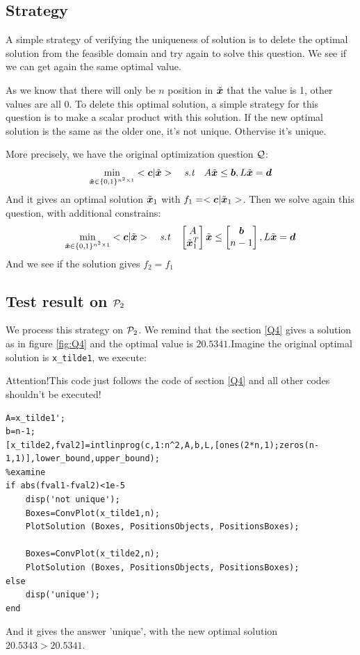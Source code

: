 \documentclass{CSArticle}[english]
\def\xtd{\tilde{\xbs}}
\begin{document}
\subsection{Strategy}
A simple strategy of verifying the uniqueness of solution is to delete the optimal solution from the feasible domain and try again to solve this question. We see if we can get again the same optimal value.\par
As we know that there will only be $n$ position in $\xtd$ that the value is 1, other values are all 0. To delete this optimal solution, a simple strategy for this question is to make a scalar product with this solution. If the new optimal solution is the same as the older one, it's not unique. Othervise it's unique.\par
More precisely, we have the original optimization question $\mathcal{Q}$:
\begin{equation*}
        \min_{\xtd \in \{0,1\}^{n^2\times 1}} <\cbs|\xtd> \quad \st  \quad A \xtd \le \bbs, L\xtd= \dbs
\end{equation*}
And it gives an optimal solution $\xtd_1$ with $f_1=<\cbs|\xtd_1>$.
Then we solve again this question, with additional constrains:
\begin{equation*}
        \min_{\xtd \in \{0,1\}^{n^2\times 1}} <\cbs|\xtd> \quad \st  \quad \left[\begin{matrix}A\\\xtd_1^{T}\end{matrix}\right] \xtd \le \left[\begin{matrix}\bbs\\n-1\end{matrix}\right], L\xtd= \dbs
\end{equation*}
And we see if the solution gives $f_2=f_1$
\subsection{Test result on $\mathcal{P}_2$}
We process this strategy on $\mathcal{P}_2$. We remind that the section \ref{Q4} gives a solution as in figure \ref{fig:Q4} and the optimal value is $20.5341$.Imagine the original optimal solution is \verb|x_tilde1|, we execute:
\par {\color{red}Attention!This code just follows the code of section \ref{Q4} and all other codes shouldn't be executed!}
\begin{lstlisting}[style=MATLAB]
%New solution
A=x_tilde1';
b=n-1;
[x_tilde2,fval2]=intlinprog(c,1:n^2,A,b,L,[ones(2*n,1);zeros(n-1,1)],lower_bound,upper_bound);
%examine
if abs(fval1-fval2)<1e-5
    disp('not unique');
    Boxes=ConvPlot(x_tilde1,n);
    PlotSolution (Boxes, PositionsObjects, PositionsBoxes);

    Boxes=ConvPlot(x_tilde2,n);
    PlotSolution (Boxes, PositionsObjects, PositionsBoxes);
else
    disp('unique');
end
\end{lstlisting}
And it gives the answer 'unique', with the new optimal solution $20.5343>20.5341$.
\end{document}

